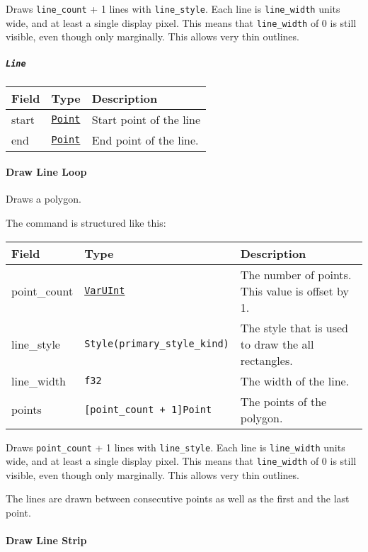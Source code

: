 \documentclass[
]{article}
\begin{document}
Draws \texttt{line\_count} + 1 lines with \texttt{line\_style}. Each
line is \texttt{line\_width} units wide, and at least a single display
pixel. This means that \texttt{line\_width} of 0 is still visible, even
though only marginally. This allows very thin outlines.

\hypertarget{line}{%
\subparagraph{\texorpdfstring{\texttt{Line}}{Line}}\label{line}}

\begin{longtable}[]{@{}lll@{}}
\toprule
Field & Type & Description \\
\midrule
\endhead
start & \protect\hyperlink{point}{\texttt{Point}} & Start point of the
line \\
end & \protect\hyperlink{point}{\texttt{Point}} & End point of the
line. \\
\bottomrule
\end{longtable}

\hypertarget{draw-line-loop}{%
\paragraph{Draw Line Loop}\label{draw-line-loop}}

Draws a polygon.

The command is structured like this:

\begin{longtable}[]{@{}lll@{}}
\toprule
Field & Type & Description \\
\midrule
\endhead
point\_count & \protect\hyperlink{varuint}{\texttt{VarUInt}} & The
number of points. This value is offset by 1. \\
line\_style & \texttt{Style(primary\_style\_kind)} & The style that is
used to draw the all rectangles. \\
line\_width & \texttt{f32} & The width of the line. \\
points & \texttt{{[}point\_count\ +\ 1{]}Point} & The points of the
polygon. \\
\bottomrule
\end{longtable}

Draws \texttt{point\_count} + 1 lines with \texttt{line\_style}. Each
line is \texttt{line\_width} units wide, and at least a single display
pixel. This means that \texttt{line\_width} of 0 is still visible, even
though only marginally. This allows very thin outlines.

The lines are drawn between consecutive points as well as the first and
the last point.

\hypertarget{draw-line-strip}{%
\paragraph{Draw Line Strip}\label{draw-line-strip}}
\end{document}
